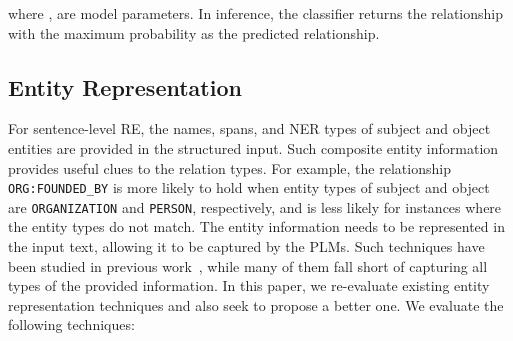 \documentclass[11pt,a4paper]{article}
\begin{document}
where ,  are model parameters.
In inference, the classifier returns the relationship with the maximum probability as the predicted relationship.
\subsection{Entity Representation}
\label{sec:entity_representation}
For sentence-level RE, the names, spans, and NER types of subject and object entities are provided in the structured input.
Such composite entity information provides useful clues to the relation types.
For example, the relationship \texttt{ORG:FOUNDED\_BY} is more likely to hold when entity types of subject and object are \texttt{ORGANIZATION} and \texttt{PERSON}, respectively, and is less likely for instances where the entity types do not match.
The entity information needs to be represented in the input text, allowing it to be captured by the PLMs.
Such techniques have been studied in previous work~\cite{zhang-etal-2017-position,baldini-soares-etal-2019-matching,wang2020k}, while many of them fall short of capturing all types of the provided information.
In this paper, we re-evaluate existing entity representation techniques and also seek to propose a better one.
We evaluate the following techniques:
\end{document}
